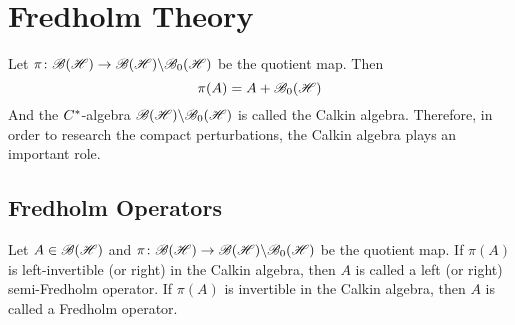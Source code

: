 \section{Fredholm Theory}

Let $\pi \colon \mathscr{B(H)} \rightarrow \mathscr{B(H)} \backslash \mathscr{B}_{0}\mathscr{(H)}$ be the quotient map. Then 
\begin{equation*}
	\pi(A) = A + \mathscr{B}_{0}\mathscr{(H)}
\end{equation*}
And the $C^{*}$-algebra $\mathscr{B(H)} \backslash \mathscr{B}_{0}\mathscr{(H)}$ is called the Calkin algebra. Therefore, in order to research the compact perturbations, the Calkin algebra plays an important role. 

\subsection{Fredholm Operators}

\begin{defn}
	Let $A \in \mathscr{B(H)}$ and $\pi \colon \mathscr{B(H)} \rightarrow \mathscr{B(H)} \backslash \mathscr{B}_{0}\mathscr{(H)}$ be the quotient map. If $\pi(A)$ is left-invertible (or right) in the Calkin algebra, then $A$ is called a left (or right) semi-Fredholm operator. If $\pi(A)$ is invertible in the Calkin algebra, then $A$ is called a Fredholm operator.
\end{defn}

